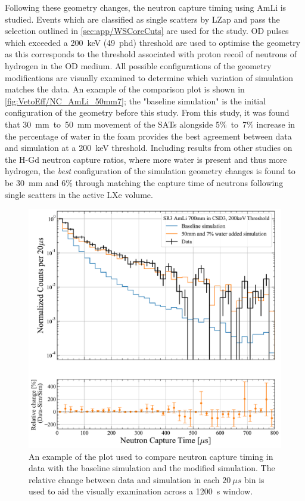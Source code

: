 Following these geometry changes, the neutron capture timing using AmLi is studied. Events which are classified as single scatters by LZap and pass the selection outlined in \autoref{sec:app/WSCoreCuts} are used for the study. OD pulses which exceeded a 200~keV (49~phd) threshold are used to optimise the geometry as this corresponds to the threshold associated with proton recoil of neutrons of hydrogen in the OD medium.
All possible configurations of the geometry modifications are visually examined to determine which variation of simulation matches the data. An example of the comparison plot is shown in \autoref{fig:VetoEff/NC_AmLi_50mm7}; the "baseline simulation" is the initial configuration of the geometry before this study.
From this study, it was found that 30~mm~to~50~mm movement of the SATs alongside 5\%~to~7\% increase in the percentage of water in the foam provides the best agreement between data and simulation at a 200~keV threshold. Including results from other studies on the H-Gd neutron capture ratios, where more water is present and thus more hydrogen, the \textit{best} configuration of the simulation geometry changes is found to be 30~mm and 6\% through matching the capture time of neutrons following single scatters in the active LXe volume.
\begin{figure}[!h]
	\centering
	\includegraphics[width=0.8\linewidth]{figures/VetoEfficiency/movedSAT50mm_7percentWater_AmLi_CSD3_Z700mm_200keV_Ratio.pdf}
	\caption[An example of the plot used to compare neutron capture timing in data with the baseline simulation and the modified simulation.]{An example of the plot used to compare neutron capture timing in data with the baseline simulation and the modified simulation. The relative change between data and simulation in each $20~\mu s$ bin is used to aid the visually examination across a 1200~\textmu s window.}
	\label{fig:VetoEff/NC_AmLi_50mm7}
\end{figure}

